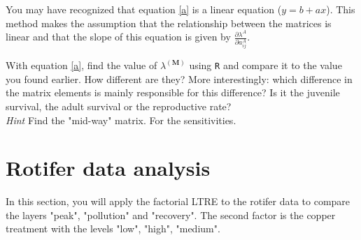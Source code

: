 \documentclass{article}\usepackage[]{graphicx}\usepackage[]{color}
\begin{document}
You may have recognized that equation \ref{a} is a linear equation ($y=b+ax$). This method makes the assumption that the relationship between the matrices is linear and that the slope of this equation is given by $\frac{ \partial\lambda^{A}}{\partial a^{A}_{ij}}$.


With equation \ref{a}, find the value of $\lambda^{(\boldsymbol{M})}$ using \texttt{R} and compare it to the value you found earlier. How different are they? More interestingly: which difference in the matrix elements is mainly responsible for this difference? Is it the juvenile survival, the adult survival or the reproductive rate?\\[1.5ex]

\textit{Hint} Find the "mid-way" matrix. For the sensitivities.

\section{Rotifer data analysis}
In this section, you will apply the factorial LTRE to the rotifer data to compare the layers "peak", "pollution" and "recovery". The second factor is the copper treatment with the levels "low", "high", "medium".
\end{document}
